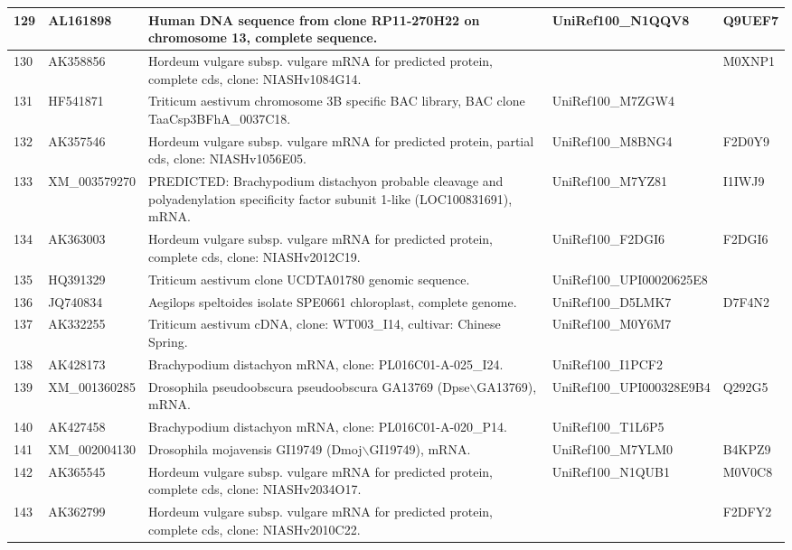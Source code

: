 \documentclass[10.9pt]{article} %
\begin{document}
{\begin{longtable}{|p{1.3cm}|p{1.8cm}|p{6.2cm}|p{3.8cm}|p{2cm}|}
\hline
129 & AL161898 & Human DNA sequence from clone RP11-270H22 on chromosome 13, complete sequence. & UniRef100\_N1QQV8 & Q9UEF7\\
\hline
130 & AK358856 & Hordeum vulgare subsp. vulgare mRNA for predicted protein, complete cds, clone: NIASHv1084G14. &  & M0XNP1\\
\hline
131 & HF541871 & Triticum aestivum chromosome 3B specific BAC library, BAC clone TaaCsp3BFhA\_0037C18. & UniRef100\_M7ZGW4 & \\
\hline
132 & AK357546 & Hordeum vulgare subsp. vulgare mRNA for predicted protein, partial cds, clone: NIASHv1056E05. & UniRef100\_M8BNG4 & F2D0Y9\\
\hline
133 & XM\_003579270 & PREDICTED: Brachypodium distachyon probable cleavage and polyadenylation specificity factor subunit 1-like (LOC100831691), mRNA. & UniRef100\_M7YZ81 & I1IWJ9\\
\hline
134 & AK363003 & Hordeum vulgare subsp. vulgare mRNA for predicted protein, complete cds, clone: NIASHv2012C19. & UniRef100\_F2DGI6 & F2DGI6\\
\hline
135 & HQ391329 & Triticum aestivum clone UCDTA01780 genomic sequence. & UniRef100\_UPI00020625E8 & \\
\hline
136 & JQ740834 & Aegilops speltoides isolate SPE0661 chloroplast, complete genome. & UniRef100\_D5LMK7 & D7F4N2\\
\hline
137 & AK332255 & Triticum aestivum cDNA, clone: WT003\_I14, cultivar: Chinese Spring. & UniRef100\_M0Y6M7 & \\
\hline
138 & AK428173 & Brachypodium distachyon mRNA, clone: PL016C01-A-025\_I24. & UniRef100\_I1PCF2 & \\
\hline
139 & XM\_001360285 & Drosophila pseudoobscura pseudoobscura GA13769 (Dpse$\backslash$GA13769), mRNA. & UniRef100\_UPI000328E9B4 & Q292G5\\
\hline
140 & AK427458 & Brachypodium distachyon mRNA, clone: PL016C01-A-020\_P14. & UniRef100\_T1L6P5 & \\
\hline
141 & XM\_002004130 & Drosophila mojavensis GI19749 (Dmoj$\backslash$GI19749), mRNA. & UniRef100\_M7YLM0 & B4KPZ9\\
\hline
142 & AK365545 & Hordeum vulgare subsp. vulgare mRNA for predicted protein, complete cds, clone: NIASHv2034O17. & UniRef100\_N1QUB1 & M0V0C8\\
\hline
143 & AK362799 & Hordeum vulgare subsp. vulgare mRNA for predicted protein, complete cds, clone: NIASHv2010C22. &  & F2DFY2\\

\end{longtable}}
\end{document}
